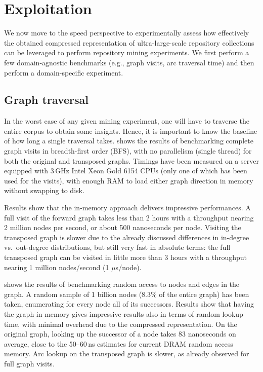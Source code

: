 \section{Exploitation}%
\label{sec:compression-exploitation}

We now move to the speed perspective to experimentally assess how effectively
the obtained compressed representation of ultra-large-scale repository
collections can be leveraged to perform repository mining experiments. We first
perform a few domain-agnostic benchmarks (e.g., graph visits, arc traversal
time) and then perform a domain-specific experiment.


\subsection{Graph traversal}%
\label{sec:compression-exptraversal}

In the worst case of any given mining experiment, one will have to traverse the
entire corpus to obtain some insights. Hence, it is important to know the
baseline of how long a single traversal takes.
 shows the results of benchmarking complete
graph visits in breadth-first order (BFS), with no parallelism (single thread)
for both the original and transposed graphs. Timings have been measured on a
server equipped with 3\,GHz Intel Xeon Gold 6154 CPUs (only one of which has
been used for the visits), with enough RAM to load either graph direction in
memory without swapping to disk.

Results show that the in-memory approach delivers impressive performances. A
full visit of the forward graph takes less than 2 hours with a throughput
nearing 2 million nodes per second, or about 500 nanoseconds per node. Visiting
the transposed graph is slower due to the already discussed differences in
in-degree vs.\ out-degree distributions, but still very fast in absolute terms:
the full transposed graph can be visited in little more than 3 hours with a
throughput nearing 1 million nodes/second (1 $\mu$s/node).

 shows the results of benchmarking
random access to nodes and edges in the graph. A random sample of 1 billion
nodes (8.3\% of the entire graph) has been taken, enumerating for every node
all of its successors.  Results show that having the graph in memory gives
impressive results also in terms of random lookup time, with minimal overhead
due to the compressed representation. On the original graph, looking up the
successor of a node takes 83 nanoseconds on average, close to the 50--60\,ns
estimates for current DRAM random access memory. Arc lookup on the transposed
graph is slower, as already observed for full graph visits.

